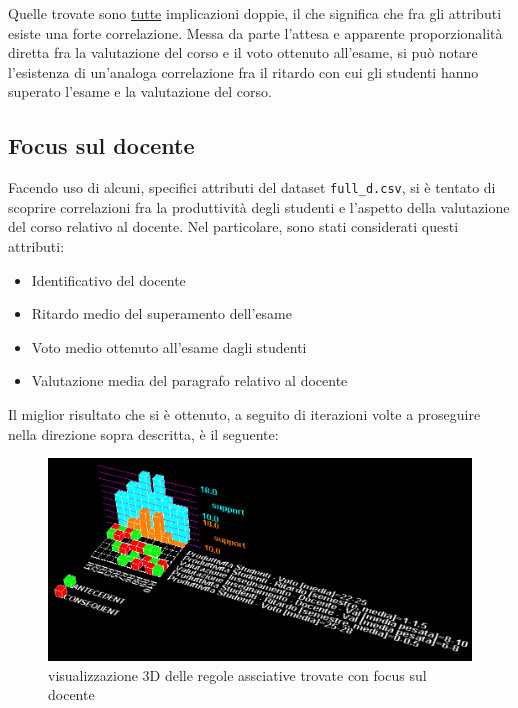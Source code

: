             Quelle trovate sono \underline{tutte} implicazioni doppie, il che significa che fra gli attributi esiste una forte correlazione. Messa da parte l'attesa e apparente proporzionalità diretta fra la valutazione del corso e il voto ottenuto all'esame, si può notare l'esistenza di un'analoga correlazione fra il ritardo con cui gli studenti hanno superato l'esame e la valutazione del corso.

        \subsection{Focus sul docente}

            Facendo uso di alcuni, specifici attributi del dataset \texttt{full\_d.csv}, si è tentato di scoprire correlazioni fra la produttività degli studenti e l'aspetto della valutazione del corso relativo al docente. Nel particolare, sono stati considerati questi attributi:

            \begin{itemize}
                \item Identificativo del docente
                \item Ritardo medio del superamento dell'esame
                \item Voto medio ottenuto all'esame dagli studenti
                \item Valutazione media del paragrafo relativo al docente
            \end{itemize}

            Il miglior risultato che si è ottenuto, a seguito di iterazioni volte a proseguire nella direzione sopra descritta, è il seguente: \\

            

            \begin{figure}
                \centering
                \caption{visualizzazione 3D delle regole assciative trovate con focus sul docente}
                \label{apriori_min_2}
	            \includegraphics[scale=0.4]{../ass/apriori_min_2.png}
            \end{figure}

